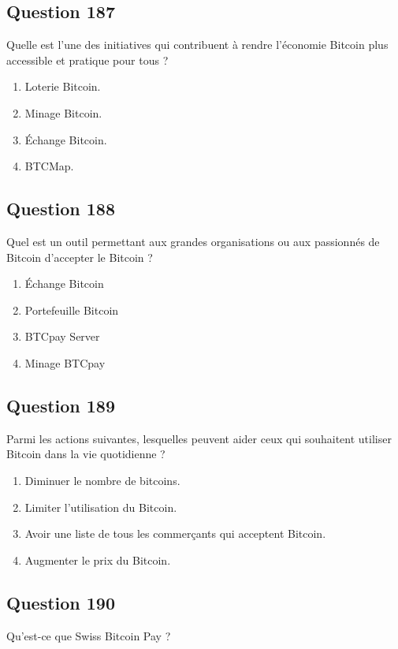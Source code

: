 \documentclass[12pt,a4paper]{article}
\begin{document}
\subsection*{Question 187}
Quelle est l'une des initiatives qui contribuent à rendre l'économie Bitcoin plus accessible et pratique pour tous ?

\begin{enumerate}[label=\Alph*., leftmargin=*]
\item Loterie Bitcoin.
\item Minage Bitcoin.
\item Échange Bitcoin.
\item BTCMap.
\end{enumerate}

\bigskip


\subsection*{Question 188}
Quel est un outil permettant aux grandes organisations ou aux passionnés de Bitcoin d'accepter le Bitcoin ?

\begin{enumerate}[label=\Alph*., leftmargin=*]
\item Échange Bitcoin
\item Portefeuille Bitcoin
\item BTCpay Server
\item Minage BTCpay
\end{enumerate}

\bigskip


\subsection*{Question 189}
Parmi les actions suivantes, lesquelles peuvent aider ceux qui souhaitent utiliser Bitcoin dans la vie quotidienne ?

\begin{enumerate}[label=\Alph*., leftmargin=*]
\item Diminuer le nombre de bitcoins.
\item Limiter l'utilisation du Bitcoin.
\item Avoir une liste de tous les commerçants qui acceptent Bitcoin.
\item Augmenter le prix du Bitcoin.
\end{enumerate}

\bigskip


\subsection*{Question 190}
Qu'est-ce que Swiss Bitcoin Pay ?
\end{document}
